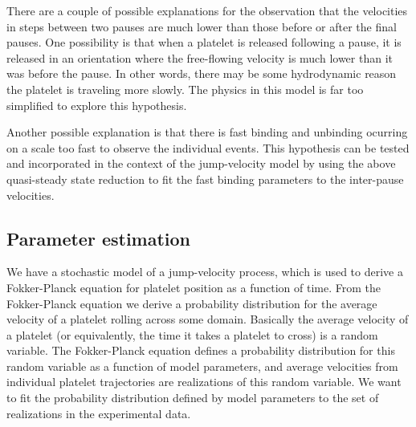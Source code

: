 There are a couple of possible explanations for the observation that
the velocities in steps between two pauses are much lower than those
before or after the final pauses. One possibility is that when a
platelet is released following a pause, it is released in an
orientation where the free-flowing velocity is much lower than it was
before the pause. In other words, there may be some hydrodynamic
reason the platelet is traveling more slowly. The physics in this
model is far too simplified to explore this hypothesis.

Another possible explanation is that there is fast binding and
unbinding ocurring on a scale too fast to observe the individual
events. This hypothesis can be tested and incorporated in the context
of the jump-velocity model by using the above quasi-steady state
reduction to fit the fast binding parameters to the inter-pause
velocities.


\subsection{Parameter estimation}
\label{sec:parameter-estimation}


We have a stochastic model of a jump-velocity process, which is used
to derive a Fokker-Planck equation for platelet position as a function
of time. From the Fokker-Planck equation we derive a probability
distribution for the average velocity of a platelet rolling across
some domain. Basically the average velocity of a platelet (or
equivalently, the time it takes a platelet to cross) is a random
variable. The Fokker-Planck equation defines a probability
distribution for this random variable as a function of model
parameters, and average velocities from individual platelet
trajectories are realizations of this random variable. We want to fit
the probability distribution defined by model parameters to the set of
realizations in the experimental data.

